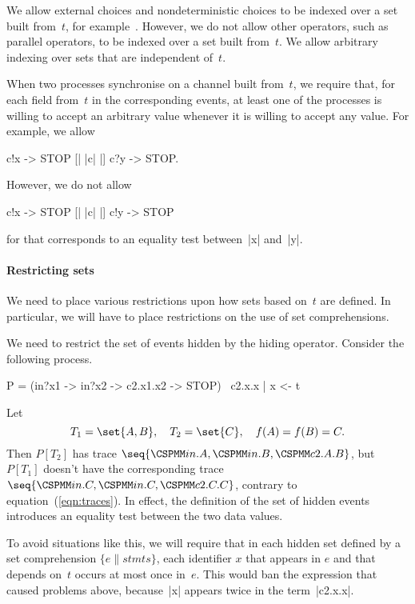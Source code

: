 We allow external choices and nondeterministic choices to be indexed over a
set built from~$t$, for example~.  However, we
do not allow other operators, such as parallel operators, to be indexed over a
set built from~$t$.  We allow arbitrary indexing over sets that are
independent of~$t$. 

When two processes synchronise on a channel built from~$t$, we require that,
for each field from~$t$ in the corresponding events, at least one of the
processes is willing to accept an arbitrary value whenever it is willing to
accept any value.  For example, we allow
\begin{cspm}
c!x -> STOP [| {|c|} |] c?y -> STOP.
\end{cspm}
However, we do not allow 
\begin{cspm}
c!x -> STOP [| {|c|} |] c!y -> STOP
\end{cspm}
for that corresponds to an equality test between~|x| and~|y|. 


\paragraph{Restricting sets}

We need to place various restrictions upon how sets based on~$t$ are defined.
In particular, we will have to place restrictions on the use of set
comprehensions. 

We need to restrict the set of events hidden by the hiding operator.  Consider
the following process.
\begin{cspm}
P = (in?x1 -> in?x2 -> c2.x1.x2 -> STOP) \ {c2.x.x | x <- t}
\end{cspm}
Let
\[
T_1 = \set{A,B}, \quad T_2 = \set{C}, \quad f(A) = f(B) =  C.
\]
Then $P[T_2]$ has trace $\seq{\M{in}.A, \M{in}.B, \M{c2}.A.B}$, but $P[T_1]$
doesn't have the corresponding trace $\seq{\M{in}.C, \M{in}.C, \M{c2}.C.C}$,
contrary to equation~(\ref{eqn:traces}).  In effect, the definition of the set
of hidden events introduces an equality test between the two data values.

To avoid situations like this, we will require that in each hidden set defined
by a set comprehension $\{ e \| stmts\}$, each identifier $x$ that appears in
$e$ and that depends on~$t$ occurs at most once in~$e$.  This would ban the
expression  that caused problems above, because~|x|
appears twice in the term~|c2.x.x|.

